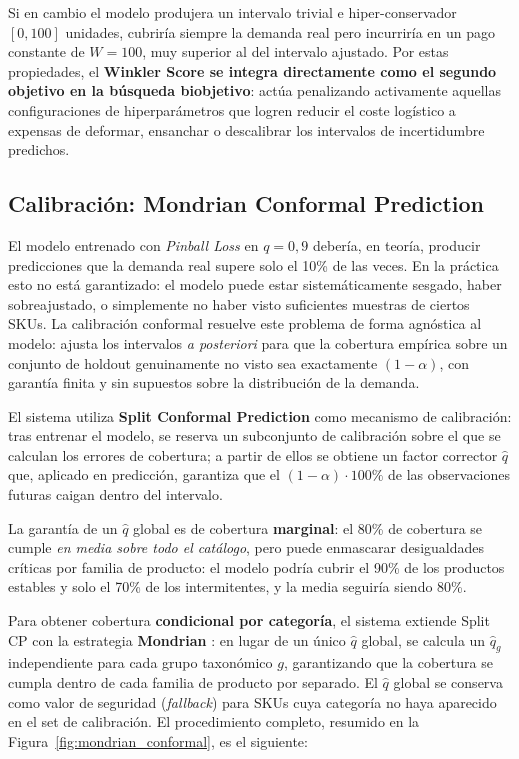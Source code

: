 Si en cambio el modelo produjera un intervalo trivial e hiper-conservador $[0, 100]$ unidades, cubriría siempre la demanda real pero incurriría en un pago constante de $W = 100$, muy superior al del intervalo ajustado. Por estas propiedades, el \textbf{Winkler Score se integra directamente como el segundo objetivo en la búsqueda biobjetivo}: actúa penalizando activamente aquellas configuraciones de hiperparámetros que logren reducir el coste logístico a expensas de deformar, ensanchar o descalibrar los intervalos de incertidumbre predichos.

\subsection{Calibración: Mondrian Conformal Prediction}
\label{sec:conformal}
El modelo entrenado con \textit{Pinball Loss} en $q = 0{,}9$ debería, en teoría, producir
predicciones que la demanda real supere solo el 10\% de las veces. En la práctica esto no
está garantizado: el modelo puede estar sistemáticamente sesgado, haber sobreajustado, o
simplemente no haber visto suficientes muestras de ciertos SKUs. La calibración conformal
resuelve este problema de forma agnóstica al modelo: ajusta los intervalos \textit{a
posteriori} para que la cobertura empírica sobre un conjunto de holdout genuinamente no
visto sea exactamente $(1-\alpha)$, con garantía finita y sin supuestos sobre la
distribución de la demanda.

El sistema utiliza \textbf{Split Conformal Prediction} \cite{angelopoulos2021gentle} como
mecanismo de calibración: tras entrenar el modelo, se reserva un subconjunto de calibración
sobre el que se calculan los errores de cobertura; a partir de ellos se obtiene un factor
corrector $\hat{q}$ que, aplicado en predicción, garantiza que el $(1-\alpha)\cdot 100\%$ de
las observaciones futuras caigan dentro del intervalo.

La garantía de un $\hat{q}$ global es de cobertura \textbf{marginal}: el 80\% de cobertura
se cumple \textit{en media sobre todo el catálogo}, pero puede enmascarar desigualdades
críticas por familia de producto: el modelo podría cubrir el 90\% de los productos
estables y solo el 70\% de los intermitentes, y la media seguiría siendo 80\%.

Para obtener cobertura \textbf{condicional por categoría}, el sistema extiende Split CP
con la estrategia \textbf{Mondrian} \cite{vovk2005algorithmic}: en lugar de un único
$\hat{q}$ global, se calcula un $\hat{q}_g$ independiente para cada grupo taxonómico $g$,
garantizando que la cobertura se cumpla dentro de cada familia de producto por separado.
El $\hat{q}$ global se conserva como valor de seguridad (\textit{fallback}) para SKUs cuya
categoría no haya aparecido en el set de calibración. El procedimiento completo, resumido en la
Figura~\ref{fig:mondrian_conformal}, es el siguiente:

